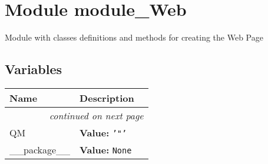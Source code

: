 %
%
%


\section{Module module\_Web}

    \label{module_Web}

Module with classes definitions and methods for creating the Web Page


  \subsection{Variables}

    \vspace{-1cm}
\hspace{\varindent}\begin{longtable}{|p{\varnamewidth}|p{\vardescrwidth}|l}
\cline{1-2}
\cline{1-2} \centering \textbf{Name} & \centering \textbf{Description}& \\
\cline{1-2}
\endhead\cline{1-2}\multicolumn{3}{r}{\small\textit{continued on next page}}\\\endfoot\cline{1-2}
\endlastfoot\raggedright Q\-M\- & \raggedright \textbf{Value:} 
{\tt \texttt{'}\texttt{"}\texttt{'}}&\\
\cline{1-2}
\raggedright \_\-\_\-p\-a\-c\-k\-a\-g\-e\-\_\-\_\- & \raggedright \textbf{Value:} 
{\tt None}&\\
\cline{1-2}
\end{longtable}



